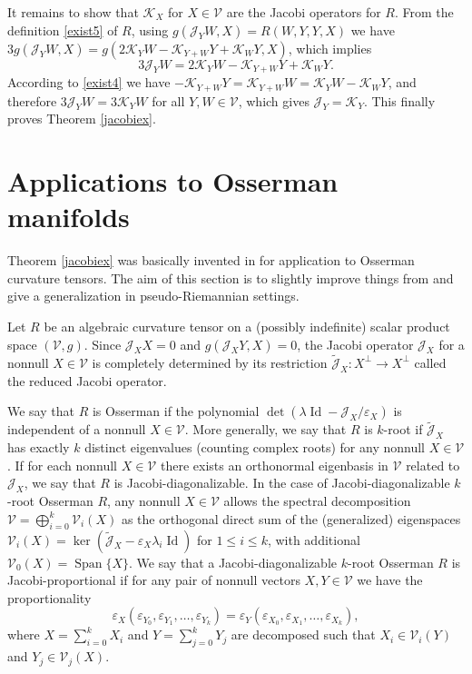 \documentclass[preprint]{elsarticle}
\newcommand\mc{\mathcal}
\newcommand\ve{\varepsilon}%
\DeclareMathOperator{\Span}{Span}
\DeclareMathOperator{\id}{Id}
\begin{document}
It remains to show that $\mc{K}_X$ for $X\in\mc{V}$ are the Jacobi operators for $R$.
From the definition \eqref{exist5} of $R$, using $g(\mc{J}_YW,X)=R(W,Y,Y,X)$ we have
$3g(\mc{J}_YW,X)=g(2\mc{K}_{Y}W - \mc{K}_{Y+W}Y +\mc{K}_{W}Y,X)$, which implies
\begin{equation*}
3\mc{J}_YW=2\mc{K}_{Y}W - \mc{K}_{Y+W}Y +\mc{K}_{W}Y.
\end{equation*} 
According to \eqref{exist4} we have $-\mc{K}_{Y+W}Y=\mc{K}_{Y+W}W=\mc{K}_YW -\mc{K}_WY$,
and therefore $3\mc{J}_YW=3\mc{K}_{Y}W$ for all $Y,W\in\mc{V}$, which gives $\mc{J}_Y=\mc{K}_Y$.
This finally proves Theorem \ref{jacobiex}.


\section{Applications to Osserman manifolds}\label{APPLI}

Theorem \ref{jacobiex} was basically invented in \cite{A9} for application to Osserman curvature tensors.
The aim of this section is to slightly improve things from \cite{A9} and give a generalization in pseudo-Riemannian settings.

Let $R$ be an algebraic curvature tensor on a (possibly indefinite) scalar product space $(\mc{V},g)$.
Since $\mc{J}_XX=0$ and $g(\mc{J}_XY,X)=0$, the Jacobi operator $\mc{J}_X$ for a nonnull $X\in\mc{V}$ 
is completely determined by its restriction $\widetilde{\mc{J}}_X\colon X^\perp \to X^\perp$ called the reduced Jacobi operator.

We say that $R$ is Osserman if the polynomial $\det(\lambda\id-\mc{J}_X/\ve_X)$ is independent of a nonnull $X\in\mc{V}$.
More generally, we say that $R$ is $k$-root if $\widetilde{\mc{J}}_X$ has exactly $k$ distinct eigenvalues
(counting complex roots) for any nonnull $X\in\mc{V}$.
If for each nonnull $X\in\mc{V}$ there exists an orthonormal eigenbasis in $\mc{V}$ related to $\mc{J}_X$, we say that $R$ is Jacobi-diagonalizable.
In the case of Jacobi-diagonalizable $k$-root Osserman $R$, any nonnull $X\in\mc{V}$ 
allows the spectral decomposition $\mc{V}=\bigoplus_{i=0}^k \mc{V}_i(X)$ 
as the orthogonal direct sum of the (generalized) eigenspaces $\mc{V}_i(X)=\ker(\widetilde{\mc{J}}_X-\ve_X\lambda_i\id)$ for $1\leq i\leq k$, 
with additional $\mc{V}_0(X)=\Span\{X\}$.
We say that a Jacobi-diagonalizable $k$-root Osserman $R$ is Jacobi-proportional if for any pair of nonnull vectors $X,Y\in\mc{V}$ we have the proportionality
\begin{equation*}
\ve_X(\ve_{Y_0}, \ve_{Y_1}, \dots, \ve_{Y_k})=\ve_Y(\ve_{X_0}, \ve_{X_1}, \dots, \ve_{X_k}),
\end{equation*}
where $X=\sum_{i=0}^kX_i$ and $Y=\sum_{j=0}^kY_j$ are decomposed such that $X_i\in\mc{V}_i(Y)$ and $Y_j\in\mc{V}_j(X)$.
\end{document}

